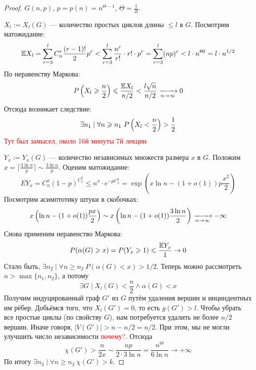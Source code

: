 \begin{proof}
	$G(n, p)$, $p = p(n) = n^{\Theta - 1}$, $\Theta = \frac{1}{2l}$.
	
	$X_l := X_l(G)$ --- количество простых циклов длины $\le l$ в $G$. Посмотрим матожидание:
	\[
		\mathbb{E} X_l = \sum_{r = 3}^l C_n^r \frac{(r - 1)!}{2} p^r < \sum_{r = 3}^l \frac{n^r}{r!} \cdot r! \cdot p^r = \sum_{r = 3}^l (np)^r < l \cdot n^{\Theta l} = l \cdot n^{1/2}
	\]
	По неравенству Маркова:
	\[
		P\left(X_l \geqslant \frac{n}{2}\right) \leqslant \frac{\mathbb{E} X_l}{n / 2} < \frac{l\sqrt{n}}{n / 2} \xrightarrow[n \to \infty]{} 0
	\]
	Отсюда возникает следствие:
	\[
		\exists n_1 \mid \forall n \geqslant n_1\ P\left(X_l < \frac{n}{2}\right) > \frac{1}{2}
	\]
	\textcolor{red}{Тут был замысел, около 16й минуты 7й лекции}
	
	$Y_x := Y_x(G)$ --- количество независимых множеств размера $x$ в $G$. Положим $x = \lceil{\frac{3\ln n}{p}}\rceil \sim \frac{3\ln n}{p}$. Оценим матожидание:
	\[
		E Y_x = C_n^x (1 - p)^{C_x^2} \le n^x \cdot e^{-pC_x^2} = \exp({x\ln n - (1 + o(1))p \frac{x^2}{2}})
	\]
	Посмотрим асимптотику штуки в скобочках:
	\[
		x\left(\ln n - (1 + o(1))\frac{px}{2}\right) \sim x\left(\ln n - (1 + o(1))\frac{3\ln n}{2}\right) \xrightarrow[n \to \infty]{} -\infty
	\]
	Снова применим неравенство Маркова:
	\[
		P(\alpha(G) \geqslant x) = P(Y_x \geqslant 1) \leqslant \frac{\mathbb{E} Y_x}{1} \to 0
	\]
	Стало быть, $\exists n_2 \mid \forall n \ge n_2\ P(\alpha(G) < x) > 1 / 2$. Теперь можно рассмотреть $n > \max \{n_1, n_2\}$, а потому
	\[
		\exists G \mid X_l(G) < \frac{n}{2} \wedge \alpha(G) < x
	\]
	Получим индуцированный граф $G'$ из $G$ путём удаления вершин и инциндентных им рёбер. Добьёмся того, что $X_l(G') = 0$, то есть $g(G') > l$. Чтобы убрать все простые циклы (по свойству $G$), нам потребуется удалить не более $n / 2$ вершин. Иначе говоря, $|V(G')| > n - n / 2 = n / 2$. При этом, мы не могли улучшить число независимости \textcolor{red}{почему?}. Отсюда
	\[
		\chi(G') > \frac{n}{2x} \sim \frac{np}{2 \cdot 3\ln n} = \frac{n^\Theta}{6\ln n} \to +\infty
	\]
	По итогу $\exists n_3 \mid \forall n \ge n_3\ \chi(G') > k$.
\end{proof}
